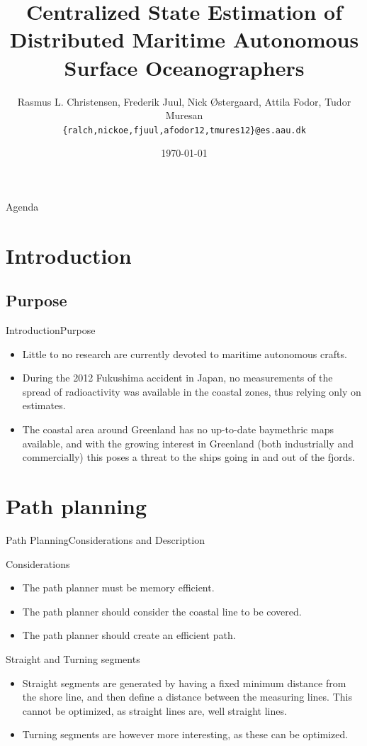 \documentclass[10pt]{beamer}
\title[Centralized State Estimation\\ of Distributed Maritime Autonomous Surface Oceanographers]%
{Centralized State Estimation of Distributed Maritime Autonomous Surface Oceanographers}
\author[Rasmus L. Christensen, Frederik Juul, Nick \O stergaard, Attila Fodor, Tudor Muresan] %
{
  Rasmus L. Christensen, Frederik Juul, Nick \O stergaard, Attila Fodor, Tudor Muresan\\
  {{\tt \{ralch,nickoe,fjuul,afodor12,tmures12\}@es.aau.dk}}
}
\institute[
  Dept.\ of Electronic Systems,\\
  Aalborg University,\\
  Denmark
] %
{%
  Department of Electronic Systems,\\
  Aalborg University,\\
  Denmark
  
}
\date{\today}
\begin{document}
\begin{frame}[plain] %
  \titlepage
\end{frame}

\begin{frame}{Agenda}{}
\tableofcontents
\end{frame}
\section{Introduction}
\subsection{Purpose}
\begin{frame}{Introduction}{Purpose}
  \begin{itemize}
  	\item<1-> Little to no research are currently devoted to maritime autonomous crafts.
    \item<2-> During the 2012 Fukushima accident in Japan, no measurements of the spread of radioactivity was available in the coastal zones, thus relying only on estimates. 
    \item<3-> The coastal area around Greenland has no up-to-date baymethric maps available, and with the growing interest in Greenland (both industrially and commercially) this poses a threat to the ships going in and out of the fjords.
  \end{itemize}
\end{frame}

\section{Path planning}
\begin{frame}{Path Planning}{Considerations and Description}
    \begin{block}{Considerations}
    \begin{itemize}
    	\item The path planner must be memory efficient.
    	\item The path planner should consider the coastal line to be covered.
    	\item The path planner should create an efficient path.
    \end{itemize}
    \end{block}
    \begin{block}{Straight and Turning segments}
    \begin{itemize}
    	\item Straight segments are generated by having a fixed minimum distance from the shore line, and then define a distance between the measuring lines. This cannot be optimized, as straight lines are, well straight lines. 
    	\item Turning segments are however more interesting, as these can be optimized.
    \end{itemize}
    \end{block}
\end{frame}
\end{document}
